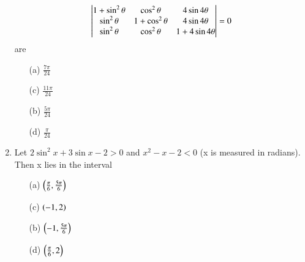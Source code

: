 \documentclass[journal,12pt,twocolumn,article]{IEEEtran}
\theoremstyle{remark}
\begin{document}
\begin{enumerate}
\[\begin{vmatrix}
$$1+\sin^2\theta$$ & $$\cos^2\theta$$ & $$4\sin4\theta$$\\
$$\sin^2\theta$$ & $$1+\cos^2\theta$$ & $$4\sin4\theta$$\\
$$\sin^2\theta$$ & $$\cos^2\theta$$ & $$1+4\sin4\theta$$
\end{vmatrix} = 0\] are
\hfill{}
\begin{multicols}{2}
\begin{enumerate}
\item[(a)] $\frac{7\pi}{24}$
\item[(c)] $\frac{11\pi}{24}$
\columnbreak
\item[(b)] $\frac{5\pi}{24}$
\item[(d)] $\frac{\pi}{24}$
\end{enumerate}
\end{multicols}
\item Let $2\sin^2x+3\sin x-2>0$ and $x^2-x-2<0$ (x is measured in radians). Then x lies in the interval
\hfill{}
\begin{multicols}{2}
\begin{enumerate}
\item[(a)] $\left(\frac{\pi}{6},\frac{5\pi}{6}\right)$
\item[(c)] $\left(-1,2\right)$
\columnbreak
\item[(b)] $\left(-1,\frac{5\pi}{6}\right)$
\item[(d)] $\left(\frac{\pi}{6},2\right)$
\end{enumerate}
\end{multicols}
\end{enumerate}
\end{document}
